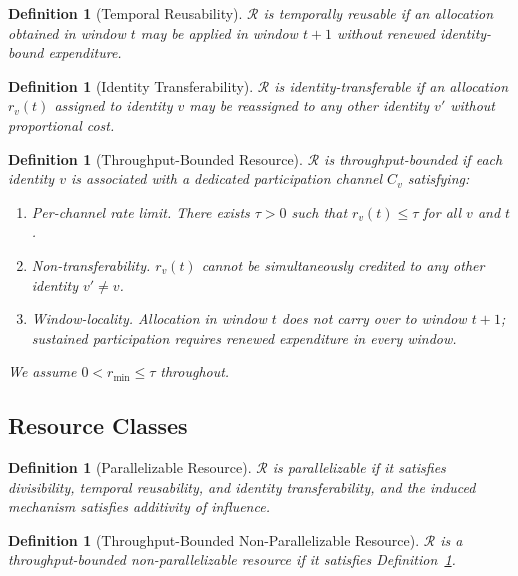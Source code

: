 \documentclass[manuscript,review]{acmart}
\newtheorem{definition}[theorem]{Definition}
\theoremstyle{remark}
\begin{document}
	\begin{definition}[Temporal Reusability]
		\label{def:reusability}
		$\mathcal{R}$ is \emph{temporally reusable} if an
		allocation obtained in window $t$ may be applied in
		window $t+1$ without renewed identity-bound expenditure.
	\end{definition}
	
	\begin{definition}[Identity Transferability]
		\label{def:transferability}
		$\mathcal{R}$ is \emph{identity-transferable} if an
		allocation $r_v(t)$ assigned to identity $v$ may be
		reassigned to any other identity $v'$ without
		proportional cost.
	\end{definition}
	
	\begin{definition}[Throughput-Bounded Resource]
		\label{def:throughput}
		$\mathcal{R}$ is \emph{throughput-bounded} if each
		identity $v$ is associated with a dedicated
		participation channel $C_v$ satisfying:
		\begin{enumerate}
			\item \emph{Per-channel rate limit.}
			There exists $\tau > 0$ such that
			$r_v(t) \leq \tau$ for all $v$ and $t$.
			\item \emph{Non-transferability.}
			$r_v(t)$ cannot be simultaneously credited
			to any other identity $v' \neq v$.
			\item \emph{Window-locality.}
			Allocation in window $t$ does not carry over
			to window $t+1$; sustained participation
			requires renewed expenditure in every window.
		\end{enumerate}
		We assume $0 < r_{\min} \leq \tau$ throughout.
	\end{definition}
	
	\subsection{Resource Classes}
	\label{ssec:classes}
	
	\begin{definition}[Parallelizable Resource]
		\label{def:parallelizable}
		$\mathcal{R}$ is \emph{parallelizable} if it satisfies
		divisibility, temporal reusability, and identity
		transferability, and the induced mechanism satisfies
		additivity of influence.
	\end{definition}
	
	\begin{definition}[Throughput-Bounded Non-Parallelizable Resource]
		\label{def:nonparallelizable}
		$\mathcal{R}$ is a \emph{throughput-bounded
			non-parallelizable resource} if it satisfies
		Definition~\ref{def:throughput}.
	\end{definition}
	
\end{document}

